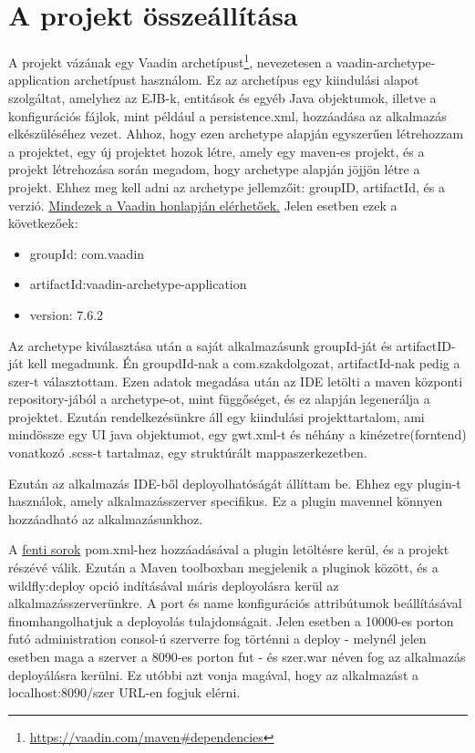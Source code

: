 \documentclass[centeredchapter]{thesis-ekf}
\theoremstyle{definition}
\theoremstyle{remark}
\begin{document}
\section{A projekt összeállítása}

A projekt vázának egy Vaadin archetípust\footnote{\url{https://vaadin.com/maven\#dependencies}}, nevezetesen a vaadin-archetype-application archetípust használom. Ez az archetípus egy kiindulási alapot szolgáltat, amelyhez az EJB-k, entitások és egyéb Java objektumok, illetve a konfigurációs fájlok, mint például a persistence.xml, hozzáadása az alkalmazás elkészüléséhez vezet.
Ahhoz, hogy ezen archetype alapján egyszerűen létrehozzam a projektet, egy új projektet hozok létre, amely egy maven-es projekt, és a projekt létrehozása során megadom, hogy archetype alapján jöjjön létre a projekt. Ehhez meg kell adni az archetype jellemzőit: groupID, artifactId, és a verzió. \href{https://vaadin.com/maven#dependencies}{Mindezek a Vaadin honlapján elérhetőek.} 
Jelen esetben ezek a következőek: 
\begin{itemize}
	\item groupId: com.vaadin
	\item artifactId:vaadin-archetype-application
	\item version: 7.6.2
\end{itemize}
Az archetype kiválasztása után a saját alkalmazásunk groupId-ját és artifactID-ját kell megadnunk. Én groupdId-nak a com.szakdolgozat, artifactId-nak pedig a szer-t választottam. Ezen adatok megadása után az IDE letölti a maven központi repository-jából a archetype-ot, mint függőséget, és ez alapján legenerálja a projektet. Ezután rendelkezésünkre áll egy kiindulási projekttartalom, ami mindössze egy UI java objektumot, egy gwt.xml-t és néhány a kinézetre(forntend) vonatkozó .scss-t tartalmaz, egy struktúrált mappaszerkezetben.

Ezután az alkalmazás IDE-ből deployolhatóságát állíttam be. Ehhez egy plugin-t használok, amely alkalmazásszerver specifikus. Ez a plugin mavennel könnyen hozzáadható az alkalmazásunkhoz.

\hypertarget{figure-wildfly}{} 	


A \hyperlink{figure-wildfly}{fenti sorok} pom.xml-hez hozzáadásával a plugin letöltésre kerül, és a projekt részévé válik. Ezután a Maven toolboxban megjelenik a pluginok között, és a wildfly:deploy opció indításával máris deployolásra kerül az alkalmazásszerverünkre. A port és name konfigurációs attribútumok beállításával finomhangolhatjuk a deployolás tulajdonságait. Jelen esetben a 10000-es porton futó administration consol-ú szerverre fog történni a deploy - melynél jelen esetben maga a szerver a 8090-es porton fut - és szer.war néven fog az alkalmazás deployálásra kerülni. Ez utóbbi azt vonja magával, hogy az alkalmazást a localhost:8090/szer URL-en fogjuk elérni. 
\end{document}
